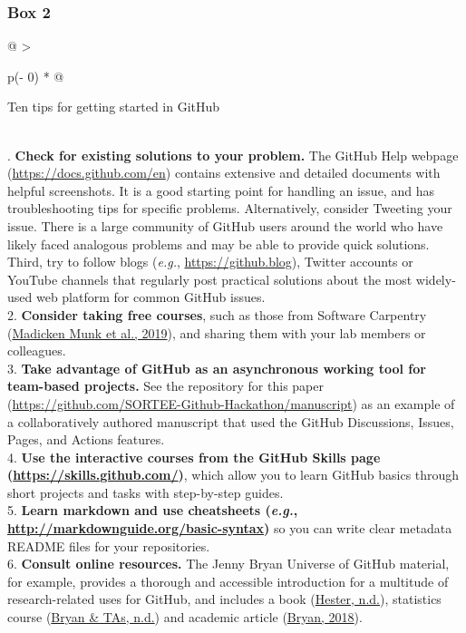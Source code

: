 \hypertarget{tips}{%
\subsubsection{Box 2}\label{tips}}

\begin{tablenos:no-prefix-table-caption}

\begin{longtable}[]{@{}
  >{\raggedright\arraybackslash}p{(\columnwidth - 0\tabcolsep) * }@{}}
\toprule
\begin{minipage}[b]{\linewidth}\raggedright
Ten tips for getting started in GitHub
\end{minipage} \\
\midrule
{}. \textbf{Check for existing solutions to your problem.} The GitHub Help webpage (\url{https://docs.github.com/en}) contains extensive and detailed documents with helpful screenshots. It is a good starting point for handling an issue, and has troubleshooting tips for specific problems. Alternatively, consider Tweeting your issue. There is a large community of GitHub users around the world who have likely faced analogous problems and may be able to provide quick solutions. Third, try to follow blogs (\emph{e.g.}, \url{https://github.blog}), Twitter accounts or YouTube channels that regularly post practical solutions about the most widely-used web platform for common GitHub issues. \\
2. \textbf{Consider taking free courses}, such as those from Software Carpentry (\protect\hyperlink{ref-pjy75gHr}{Madicken Munk et al., 2019}), and sharing them with your lab members or colleagues. \\
3. \textbf{Take advantage of GitHub as an asynchronous working tool for team-based projects.} See the repository for this paper (\url{https://github.com/SORTEE-Github-Hackathon/manuscript}) as an example of a collaboratively authored manuscript that used the GitHub Discussions, Issues, Pages, and Actions features. \\
4. \textbf{Use the interactive courses from the GitHub Skills page (\url{https://skills.github.com/})}, which allow you to learn GitHub basics through short projects and tasks with step-by-step guides. \\
5. \textbf{Learn markdown and use cheatsheets (\emph{e.g.}, \url{http://markdownguide.org/basic-syntax})} so you can write clear metadata README files for your repositories. \\
6. \textbf{Consult online resources.} The Jenny Bryan Universe of GitHub material, for example, provides a thorough and accessible introduction for a multitude of research-related uses for GitHub, and includes a book (\protect\hyperlink{ref-ZvrOcg9w}{Hester, n.d.}), statistics course (\protect\hyperlink{ref-6CMMeSeD}{Bryan \& TAs, n.d.}) and academic article (\protect\hyperlink{ref-RVetqmsg}{Bryan, 2018}). \\

\end{longtable}
\end{tablenos:no-prefix-table-caption}
